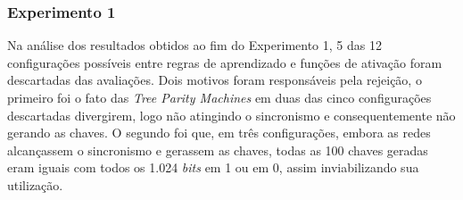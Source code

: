 \documentclass[12pt]{article}
\newcommand{\bits}{\textit{bits}\xspace}
\begin{document}


            \subsubsection{Experimento 1}
            \label{subsubsec:experimentoDelta}

                Na análise dos resultados obtidos ao fim do Experimento 1, 5 das 12 configurações possíveis entre regras de aprendizado e funções de ativação foram descartadas das avaliações. Dois motivos foram responsáveis pela rejeição, o primeiro foi o fato das \textit{Tree Parity Machines} em duas das cinco configurações descartadas divergirem, logo não atingindo o sincronismo e consequentemente não gerando as chaves. O segundo foi que, em três configurações, embora as redes alcançassem o sincronismo e gerassem as chaves, todas as 100 chaves geradas eram iguais com todos os 1.024 \bits em 1 ou em 0, assim inviabilizando sua utilização.
                

            
                
\end{document}
